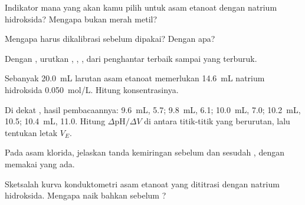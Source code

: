 \begin{exercise}[$\star$]\label{exo:g12:ph-conductivity-titrations:3}
Indikator mana yang akan kamu pilih untuk  asam etanoat dengan
natrium hidroksida? Mengapa bukan merah metil?
\end{exercise}

\begin{exercise}[$\star$]\label{exo:g12:ph-conductivity-titrations:4}
Mengapa  harus dikalibrasi sebelum dipakai? Dengan apa?
\end{exercise}

\begin{exercise}[$\star$]\label{exo:g12:ph-conductivity-titrations:5}
Dengan , urutkan  , ,
,  dari penghantar terbaik sampai yang terburuk.
\end{exercise}

\begin{exercise}[$\star\star$]\label{exo:g12:ph-conductivity-titrations:6}
Sebanyak \qty{20.0}{mL} larutan asam etanoat memerlukan \qty{14.6}{mL}
natrium hidroksida \qty{0.050}{mol/L}. Hitung konsentrasinya.
\end{exercise}

\begin{exercise}[$\star\star$]\label{exo:g12:ph-conductivity-titrations:7}
Di dekat , hasil pembacaannya: \qty{9.6}{mL},  5.7;
\qty{9.8}{mL}, 6.1; \qty{10.0}{mL}, 7.0; \qty{10.2}{mL}, 10.5;
\qty{10.4}{mL}, 11.0. Hitung $\Delta\mathrm{pH}/\Delta V$ di antara
titik-titik yang berurutan, lalu tentukan letak $V_E$.
\end{exercise}

\begin{exercise}[$\star\star$]\label{exo:g12:ph-conductivity-titrations:8}
Pada  asam klorida, jelaskan tanda kemiringan
sebelum dan sesudah , dengan memakai  yang ada.
\end{exercise}

\begin{exercise}[$\star\star$]\label{exo:g12:ph-conductivity-titrations:9}
Sketsalah kurva konduktometri asam etanoat yang dititrasi dengan
natrium hidroksida. Mengapa  naik bahkan sebelum ?
\end{exercise}

